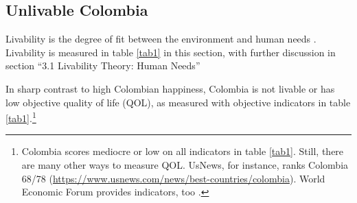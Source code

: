 \documentclass[10pt, letterpaper]{article}
\begin{document}
\begin{spacing}{2}
\section{Unlivable Colombia} %

Livability is  %
 the degree of fit between the environment and human needs 
 \citep{veenhoven14b}. Livability is measured in
table \ref{tab1} in this section, with further discussion in
section ``3.1 Livability Theory: Human Needs''


In sharp contrast to high %
 Colombian happiness, 
Colombia is not livable or has low objective
quality of life (QOL),
 as measured with 
objective indicators in table \ref{tab1}.\footnote{Colombia scores mediocre or low on
all indicators in table \ref{tab1}. Still, there are many other 
  ways to measure QOL.  UsNews, for instance, %
  ranks Colombia 68/78
  (\url{https://www.usnews.com/news/best-countries/colombia}). World Economic
  Forum provides indicators,  too \citep{world2017travel}.   
}


\end{spacing}
\end{document}
